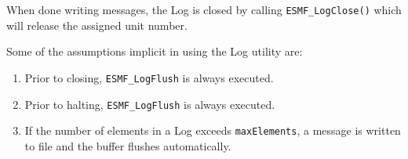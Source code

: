 When done writing messages, the Log is closed by calling 
{\tt ESMF\_LogClose()} which will release the assigned unit number.

Some of the assumptions implicit in using the Log utility are:

\begin{enumerate}

\item Prior to closing, {\tt ESMF\_LogFlush} is always executed.
\item Prior to halting, {\tt ESMF\_LogFlush} is always executed.
\item If the number of elements in a Log exceeds {\tt maxElements}, 
a message is written to file and the buffer flushes automatically.

\end{enumerate}





